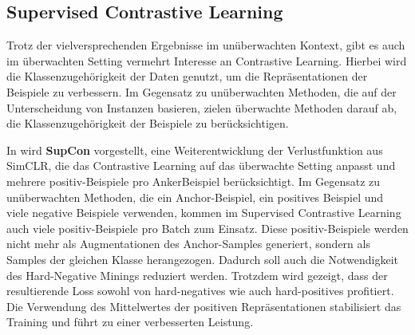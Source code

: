 \subsection{Supervised Contrastive Learning} \label{subsec:sup-contrastive}

Trotz der vielversprechenden Ergebnisse im unüberwachten Kontext, gibt es auch im überwachten Setting vermehrt Interesse an Contrastive Learning. Hierbei wird die Klassenzugehörigkeit der Daten genutzt, um die Repräsentationen der Beispiele zu verbessern. Im Gegensatz zu unüberwachten Methoden, die auf der Unterscheidung von Instanzen basieren, zielen überwachte Methoden darauf ab, die Klassenzugehörigkeit der Beispiele zu berücksichtigen.

In \parencite{Khosla2021supcon} wird \textbf{SupCon} vorgestellt, eine Weiterentwicklung der Verlustfunktion aus SimCLR, die das Contrastive Learning auf das überwachte Setting anpasst und mehrere positiv-Beispiele pro AnkerBeispiel berücksichtigt. Im Gegensatz zu unüberwachten Methoden, die ein Anchor-Beispiel, ein positives Beispiel und viele negative Beispiele verwenden, kommen im Supervised Contrastive Learning auch viele positiv-Beispiele pro Batch zum Einsatz. Diese positiv-Beispiele werden nicht mehr als Augmentationen des Anchor-Samples generiert, sondern als Samples der gleichen Klasse herangezogen. Dadurch soll auch die Notwendigkeit des Hard-Negative Minings reduziert werden. Trotzdem wird gezeigt, dass der resultierende Loss sowohl von hard-negatives wie auch hard-positives profitiert. Die Verwendung des Mittelwertes der positiven Repräsentationen stabilisiert das Training und führt zu einer verbesserten Leistung.

